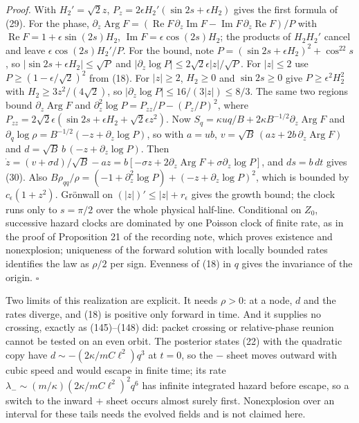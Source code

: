 \documentclass[11pt,a4paper]{article}
\begin{document}
\emph{Proof.} With \(H_2'=\sqrt2z\),
\(P_z=2\epsilon H_2'(\sin2s+\epsilon H_2)\) gives the first formula of
(29). For the phase,
\(\partial_z\operatorname{Arg}F=(\operatorname{Re}F\,\partial_z\operatorname{Im}F -\operatorname{Im}F\,\partial_z\operatorname{Re}F)/P\)
with \(\operatorname{Re}F=1+\epsilon\sin(2s)H_2\),
\(\operatorname{Im}F=\epsilon\cos(2s)H_2\); the products of \(H_2H_2'\)
cancel and leave \(\epsilon\cos(2s)H_2'/P\). For the bound, note
\(P=(\sin2s+\epsilon H_2)^2+\cos^22s\), so
\(|\sin2s+\epsilon H_2|\le\sqrt P\) and
\(|\partial_z\log P|\le2\sqrt2\epsilon|z|/\sqrt P\). For \(|z|\le2\) use
\(P\ge(1-\epsilon/\sqrt2)^2\) from (18). For \(|z|\ge2\), \(H_2\ge0\)
and \(\sin2s\ge0\) give \(P\ge\epsilon^2H_2^2\) with
\(H_2\ge3z^2/(4\sqrt2)\), so \(|\partial_z\log P|\le16/(3|z|)\le8/3\).
The same two regions bound \(\partial_z\operatorname{Arg}F\) and
\(\partial_z^2\log P=P_{zz}/P-(P_z/P)^2\), where
\(P_{zz}=2\sqrt2\epsilon(\sin2s+\epsilon H_2+\sqrt2\epsilon z^2)\). Now
\(S_q=\kappa uq/B+2\kappa B^{-1/2}\partial_z\operatorname{Arg}F\) and
\(\partial_q\log\rho=B^{-1/2}(-z+\partial_z\log P)\), so with \(a=ub\),
\(v=\sqrt B\,(az+2b\,\partial_z\operatorname{Arg}F)\) and
\(d=\sqrt B\,b\,(-z+\partial_z\log P)\). Then
\(\dot z=(v+\sigma d)/\sqrt B-az =b[-\sigma z+2\partial_z\operatorname{Arg}F+\sigma\partial_z\log P]\),
and \(ds=b\,dt\) gives (30). Also
\(B\rho_{qq}/\rho=(-1+\partial_z^2\log P)+(-z+\partial_z\log P)^2\),
which is bounded by \(c_\epsilon(1+z^2)\). Grönwall on
\((|z|)'\le|z|+r_\epsilon\) gives the growth bound; the clock runs only
to \(s=\pi/2\) over the whole physical half-line. Conditional on
\(Z_0\), successive hazard clocks are dominated by one Poisson clock of
finite rate, as in the proof of Proposition 21 of the recording note,
which proves existence and nonexplosion; uniqueness of the forward
solution with locally bounded rates identifies the law as \(\rho/2\) per
sign. Evenness of (18) in \(q\) gives the invariance of the origin.
\(\square\)

Two limits of this realization are explicit. It needs \(\rho>0\): at a
node, \(d\) and the rates diverge, and (18) is positive only forward in
time. And it supplies no crossing, exactly as (145)--(148) did: packet
crossing or relative-phase reunion cannot be tested on an even orbit.
The posterior states (22) with the quadratic copy have
\(d\sim-(2\kappa/mC\ell^2)q^3\) at \(t=0\), so the \(-\) sheet moves
outward with cubic speed and would escape in finite time; its rate
\(\lambda_-\sim(m/\kappa)(2\kappa/mC\ell^2)^2q^6\) has infinite
integrated hazard before escape, so a switch to the inward \(+\) sheet
occurs almost surely first. Nonexplosion over an interval for these
tails needs the evolved fields and is not claimed here.
\end{document}
